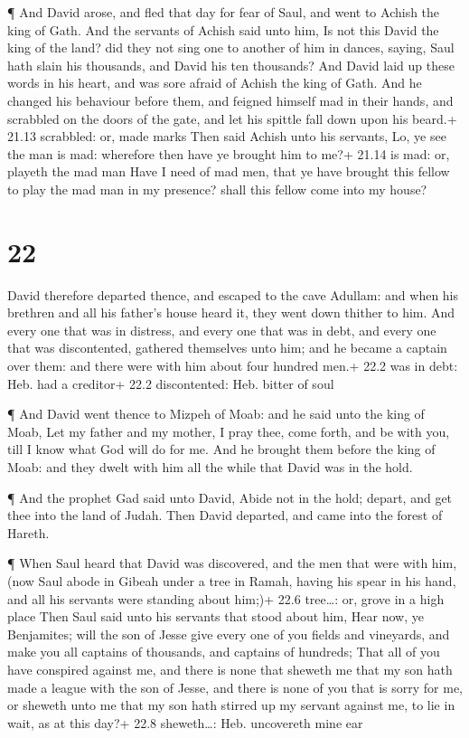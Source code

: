  ¶ And David arose, and fled that day for fear of Saul, and
went to Achish the king of Gath.  And the servants of
Achish said unto him, Is not this David the king of the land? did they
not sing one to another of him in dances, saying, Saul hath slain his
thousands, and David his ten thousands?  And David laid up
these words in his heart, and was sore afraid of Achish the king of
Gath.  And he changed his behaviour before them, and
feigned himself mad in their hands, and scrabbled on the doors of the
gate, and let his spittle fall down upon his beard.+ 21.13 scrabbled:
or, made marks  Then said Achish unto his servants, Lo, ye
see the man is mad: wherefore then have ye brought him to me?+ 21.14 is
mad: or, playeth the mad man  Have I need of mad men, that
ye have brought this fellow to play the mad man in my presence? shall
this fellow come into my house?

\hypertarget{section-21}{%
\section{22}\label{section-21}}

 David therefore departed thence, and escaped to the cave
Adullam: and when his brethren and all his father's house heard it, they
went down thither to him.  And every one that was in
distress, and every one that was in debt, and every one that was
discontented, gathered themselves unto him; and he became a captain over
them: and there were with him about four hundred men.+ 22.2 was in debt:
Heb. had a creditor+ 22.2 discontented: Heb. bitter of soul

 ¶ And David went thence to Mizpeh of Moab: and he said unto
the king of Moab, Let my father and my mother, I pray thee, come forth,
and be with you, till I know what God will do for me.  And
he brought them before the king of Moab: and they dwelt with him all the
while that David was in the hold.

 ¶ And the prophet Gad said unto David, Abide not in the
hold; depart, and get thee into the land of Judah. Then David departed,
and came into the forest of Hareth.

 ¶ When Saul heard that David was discovered, and the men
that were with him, (now Saul abode in Gibeah under a tree in Ramah,
having his spear in his hand, and all his servants were standing about
him;)+ 22.6 tree\ldots: or, grove in a high place  Then Saul
said unto his servants that stood about him, Hear now, ye Benjamites;
will the son of Jesse give every one of you fields and vineyards, and
make you all captains of thousands, and captains of hundreds;
 That all of you have conspired against me, and there is
none that sheweth me that my son hath made a league with the son of
Jesse, and there is none of you that is sorry for me, or sheweth unto me
that my son hath stirred up my servant against me, to lie in wait, as at
this day?+ 22.8 sheweth\ldots: Heb. uncovereth mine ear

